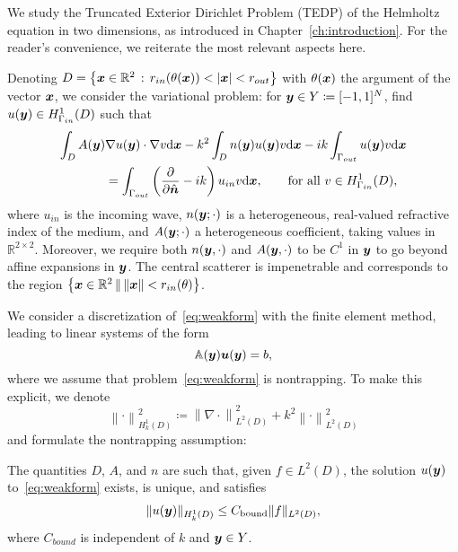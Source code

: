 We study the Truncated Exterior Dirichlet Problem (TEDP) of the Helmholtz equation in two dimensions, as introduced in Chapter~\ref{ch:introduction}.
For the reader's convenience, we reiterate the most relevant aspects here.

Denoting $D=\left\{ {{\bm{x}}}\in\mathbb{R}^2\,:\,r_{in}(\theta({{\bm{x}}})) < |{{\bm{x}}}| < r_{out} \right\}$ with $\theta({{\bm{x}}})$ the argument of the vector ${{\bm{x}}}$, we consider the variational problem: for ${\bm{y}}\in Y\coloneqq [-1, 1]^N$, find $u({\bm{y}}) \in H^{1}_{\Gamma_{in}}(D)$ such that
\begin{align}
    \int_D A({\bm{y}}) &\nabla u({\bm{y}}) \cdot \nabla v \mathrm{d}{{\bm{x}}} - k^2\int_{D}n({\bm{y}}) u({\bm{y}}) v \mathrm{d}{{\bm{x}}} - i k\int_{\Gamma_{out}} u({\bm{y}}) v\mathrm{d}{{\bm{x}}} \nonumber \\ &=\int_{\Gamma_{out}} \left( \frac{\partial}{\partial \hat{\bm{n}}} -ik\right)u_{in} v\mathrm{d}{{\bm{x}}}, \qquad
    \text{for all }v \in H^{1}_{\Gamma_{in}}(D)\label{eq:weakform},
\end{align}
where $u_{in}$ is the incoming wave, $n({\bm{y}}; \cdot)$ is a heterogeneous, real-valued refractive index of the medium, and $A({\bm{y}}; \cdot)$ a heterogeneous coefficient, taking values in $\mathbb{R}^{2\times 2}$.
Moreover, we require both $n({\bm{y}},\cdot)$ and $A({\bm{y}},\cdot)$ to be $C^1$ in ${\bm{y}}$ to go beyond affine expansions in ${\bm{y}}$.
The central scatterer is impenetrable and corresponds to the region $\left\{ {{\bm{x}}} \in \mathbb{R}^2\,\|\, \|{{\bm{x}}}\| < r_{in}(\theta) \right\}$.


We consider a discretization of~\eqref{eq:weakform} with the finite element method, leading to linear systems of the form
\begin{equation}
    \mathbb{A}({\bm{y}}){\bm{u}}({\bm{y}})=b\label{eq:linear_system},
\end{equation}
where we assume that problem~\eqref{eq:weakform} is nontrapping.
To make this explicit, we denote
\begin{equation*}
    \left\| \cdot \right\|_{H_{k}^1(D)}^2\coloneqq \left\| \nabla \cdot \right\|_{L^2(D)}^2+k^2\left\| \cdot\right\|_{L^2(D)}^2
\end{equation*}
and formulate the nontrapping assumption:
\begin{assumption}[Nontrapping]\label{ass:nontrapping}
The quantities $D$, $A$, and $n$ are such that, given $f\in L^2(D)$, the solution $u({\bm{y}})$ to~\eqref{eq:weakform} exists, is unique, and satisfies
\begin{align*}
    \|u({\bm{y}})\|_{H_{k}^1(D)}\leq C_{\text{bound}} \|f\|_{L^2(D)},
\end{align*}
where $C_{bound}$ is independent of $k$ and ${\bm{y}}\in Y$.
\end{assumption}

